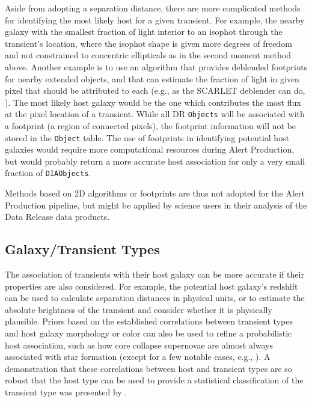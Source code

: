 \documentclass[DM,authoryear,toc]{lsstdoc}
\begin{document}
Aside from adopting a separation distance, there are more complicated methods for identifying the most likely host for a given transient.
For example, the nearby galaxy with the smallest fraction of light interior to an isophot through the transient's location, where the isophot shape is given more degrees of freedom and not constrained to concentric ellipticals as in the second moment method above.
Another example is to use an algorithm that provides deblended footprints for nearby extended objects, and that can estimate the fraction of light in given pixel that should be attributed to each (e.g., as the SCARLET deblender can do, \cite{2018A&C....24..129M}).
The most likely host galaxy would be the one which contributes the most flux at the pixel location of a transient.
While all DR {\tt Objects} will be associated with a footprint (a region of connected pixels), the footprint information will not be stored in the {\tt Object} table.
The use of footprints in identifying potential host galaxies would require more computational resources during Alert Production, but would probably return a more accurate host association for only a very small fraction of {\tt DIAObjects}. 

Methods based on 2D algorithms or footprints are thus not adopted for the Alert Production pipeline, but might be applied by science users in their analysis of the Data Release data products. 

\subsection{Galaxy/Transient Types}

The association of transients with their host galaxy can be more accurate if their properties are also considered.
For example, the potential host galaxy's redshift can be used to calculate separation distances in physical units, or to estimate the absolute brightness of the transient and consider whether it is physically plausible.
Priors based on the established correlations between transient types and host galaxy morphology or color can also be used to refine a probabilistic host association, such as how core collapse supernovae are almost always associated with star formation (except for a few notable cases, e.g., \citealt{2012ApJ...753...68G,2019ApJ...887..127I}).
A demonstration that these correlations between host and transient types are so robust that the host type can be used to provide a statistical classification of the transient type was presented by \citet{2013ApJ...778..167F}.
\end{document}
